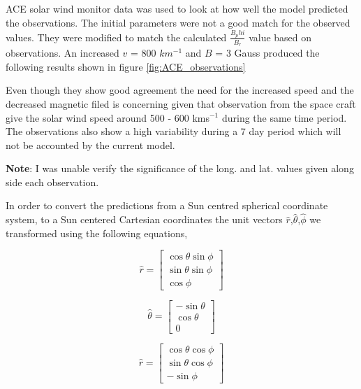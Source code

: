 \documentclass[letterpaper,skipsamekey,12pt,english]{article}
\begin{document}
ACE solar wind monitor data was used to look at how well the model predicted the observations.\cite{noauthor_ace_nodate}  The initial parameters were not a good match for the observed values. They were modified to match the calculated $ \frac{B_phi}{B_r} $ value based on observations. An increased $v $ = 800 $km^{-1}$ and $B $ = 3 Gauss produced the following results shown in figure \ref{fig:ACE_observations}

Even though they show good agreement the need for the increased speed and the decreased magnetic filed is concerning given that observation from the space craft give the solar wind speed around 500 - 600 kms$^{-1}$ during the same time period. The observations also show a high variability during a 7 day period which will not be accounted by the current model.

\textbf{Note}: I was unable verify the significance of the long. and lat. values given along side each observation.

In order to convert the predictions from a Sun centred spherical coordinate system, to a Sun centered Cartesian coordinates the unit vectors $\hat{r}$,$\hat{\theta}$,$\hat{\phi}$ we transformed using the following equations\cite{weisstein_spherical_nodate},

\begin{equation}
    \hat{r} = \left[ \begin{array}{c}
          \cos \theta \sin \phi\\
          \sin \theta \sin \phi \\
          \cos \phi
    \end{array}\right]
\end{equation}

\begin{equation}
    \hat{\theta} = \left[ \begin{array}{c}
          -\sin \theta \\
          \cos \theta  \\
          0
    \end{array}\right]
\end{equation}

\begin{equation}
    \hat{r} = \left[ \begin{array}{c}
          \cos \theta \cos \phi\\
          \sin \theta \cos \phi \\
          - \sin \phi
    \end{array}\right]
\end{equation}
\end{document}
